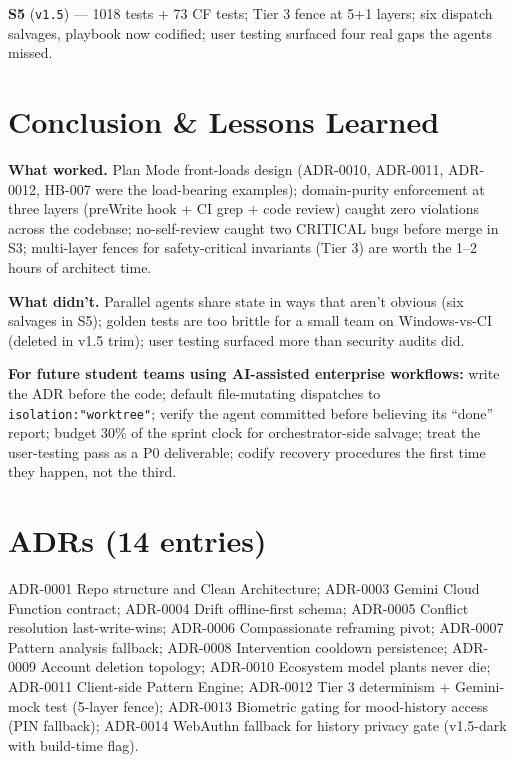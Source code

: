 \documentclass[11pt,a4paper]{article}
\begin{document}
\textbf{S5} (\texttt{v1.5}) --- 1018 tests + 73 CF tests; Tier 3 fence
at 5+1 layers; six dispatch salvages, playbook now codified; user
testing surfaced four real gaps the agents missed.

\section{Conclusion \& Lessons Learned}

\textbf{What worked.} Plan Mode front-loads design (ADR-0010, ADR-0011,
ADR-0012, HB-007 were the load-bearing examples); domain-purity
enforcement at three layers (preWrite hook + CI grep + code review)
caught zero violations across the codebase; no-self-review caught two
CRITICAL bugs before merge in S3; multi-layer fences for safety-critical
invariants (Tier 3) are worth the 1--2 hours of architect time.

\textbf{What didn't.} Parallel agents share state in ways that aren't
obvious (six salvages in S5); golden tests are too brittle for a small
team on Windows-vs-CI (deleted in v1.5 trim); user testing surfaced
more than security audits did.

\textbf{For future student teams using AI-assisted enterprise
workflows:} write the ADR before the code; default file-mutating
dispatches to \texttt{isolation:"worktree"}; verify the agent committed
before believing its ``done'' report; budget 30\% of the sprint clock
for orchestrator-side salvage; treat the user-testing pass as a P0
deliverable; codify recovery procedures the first time they happen, not
the third.

\printbibliography

\appendix

\section{ADRs (14 entries)}
ADR-0001 Repo structure and Clean Architecture; ADR-0003 Gemini Cloud
Function contract; ADR-0004 Drift offline-first schema; ADR-0005
Conflict resolution last-write-wins; ADR-0006 Compassionate reframing
pivot; ADR-0007 Pattern analysis fallback; ADR-0008 Intervention
cooldown persistence; ADR-0009 Account deletion topology; ADR-0010
Ecosystem model plants never die; ADR-0011 Client-side Pattern Engine;
ADR-0012 Tier 3 determinism + Gemini-mock test (5-layer fence); ADR-0013
Biometric gating for mood-history access (PIN fallback); ADR-0014
WebAuthn fallback for history privacy gate (v1.5-dark with build-time
flag).
\end{document}
